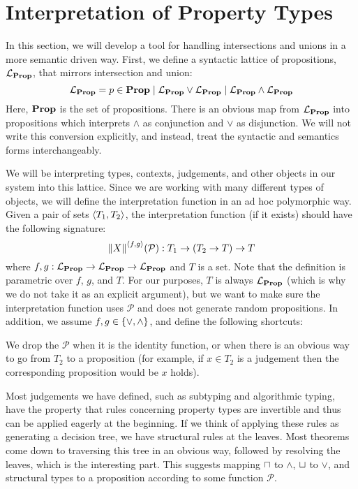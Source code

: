 
\section{Interpretation of Property Types}

In this section, we will develop a tool for handling intersections and unions in a more semantic driven way. First, we define a syntactic lattice of propositions, $\mathcal{L}_{{\mathbf{Prop}}}$, that mirrors intersection and union:
$$
\mathcal{L}_{{\mathbf{Prop}}} = p \in {\mathbf{Prop}}
             \mid \mathcal{L}_{{\mathbf{Prop}}} \vee \mathcal{L}_{{\mathbf{Prop}}}
             \mid \mathcal{L}_{{\mathbf{Prop}}} \wedge \mathcal{L}_{{\mathbf{Prop}}}
$$
Here, ${\mathbf{Prop}}$ is the set of propositions. There is an obvious map from $\mathcal{L}_{{\mathbf{Prop}}}$ into propositions which interprets $\wedge$ as conjunction and $\vee$ as disjunction. We will not write this conversion explicitly, and instead, treat the syntactic and semantics forms interchangeably.

We will be interpreting types, contexts, judgements, and other objects in our system into this lattice. Since we are working with many different types of objects, we will define the interpretation function in an ad hoc polymorphic way. Given a pair of sets $\left\langle T_1, T_2\right\rangle$, the interpretation function (if it exists) should have the following signature:
$$
  \interpGJ X {\pair f g}  : T_1 \to (T_2 \to T) \to T
$$
where $f, g : \mathcal{L}_{{\mathbf{Prop}}} \to \mathcal{L}_{{\mathbf{Prop}}} \to \mathcal{L}_{{\mathbf{Prop}}}$ and $T$ is a set. Note that the definition is parametric over $f$, $g$, and $T$. For our purposes, $T$ is always $\mathcal{L}_{{\mathbf{Prop}}}$ (which is why we do not take it as an explicit argument), but we want to make sure the interpretation function uses $\mathcal P$ and does not generate random propositions. In addition, we assume $f,g \in \lbrace\vee, \wedge\rbrace$,  and define the following shortcuts:
 We drop the $\mathcal P$ when it is the identity function, or when there is an obvious way to go from $T_2$ to a proposition (for example, if $x \in T_2$ is a judgement then the corresponding proposition would be $x$ holds).

Most judgements we have defined, such as subtyping and algorithmic typing, have the property that rules concerning property types are invertible and thus can be applied eagerly at the beginning. If we think of applying these rules as generating a decision tree, we have structural rules at the leaves. Most theorems come down to traversing this tree in an obvious way, followed by resolving the leaves, which is the interesting part. This suggests mapping $\mathbin{\sqcap}$ to $\wedge$, $\mathbin{\sqcup}$ to $\vee$, and structural types to a proposition according to some function $\mathcal P$.


